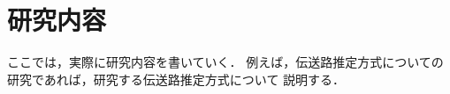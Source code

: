 \section{研究内容}
\label{sec:research}
ここでは，実際に研究内容を書いていく．
例えば，伝送路推定方式についての研究であれば，研究する伝送路推定方式について
説明する．